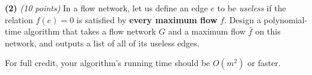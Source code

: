 \documentclass[11pt]{article}
\def\bigap{0.25in}
\begin{document}
\setlength{\parindent}{0in}
\addtolength{\parskip}{0.1cm}
\setlength{\fboxrule}{.5mm}\setlength{\fboxsep}{1.2mm}
\newlength{\boxlength}\setlength{\boxlength}{\textwidth}
\addtolength{\boxlength}{-4mm}
\begin{center}
\end{center}
\vspace{5mm}

{\bf (2)} {\em (10 points)}
In a flow network, let us define an edge $e$
to be \emph{useless} if the relation $f(e)=0$ is satisfied by
{\bf every maximum flow} $f$.  Design a polynomial-time algorithm
that takes a flow network $G$ and a maximum flow $\bar{f}$ on this 
network, and outputs a list of all of its useless edges.

For full credit, your algorithm's running time should be $O(m^2)$ or
faster.

\vskip \bigap

\end{document}
